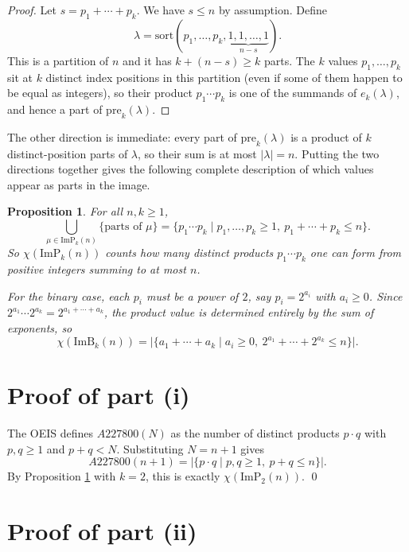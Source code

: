\documentclass[11pt]{article}
\newtheorem{proposition}[theorem]{Proposition}
\theoremstyle{remark}
\begin{document}
\begin{proof}
Let $s = p_1 + \cdots + p_k$. We have $s \leq n$ by assumption. Define
\[
\lambda = \mathrm{sort}\!\left(p_1, \dots, p_k, \underbrace{1, 1, \dots, 1}_{n - s}\right).
\]
This is a partition of $n$ and it has $k + (n - s) \geq k$ parts. The $k$ values $p_1, \dots, p_k$ sit at $k$ distinct index positions in this partition (even if some of them happen to be equal as integers), so their product $p_1 \cdots p_k$ is one of the summands of $e_k(\lambda)$, and hence a part of $\mathrm{pre}_k(\lambda)$.
\end{proof}

The other direction is immediate: every part of $\mathrm{pre}_k(\lambda)$ is a product of $k$ distinct-position parts of $\lambda$, so their sum is at most $|\lambda| = n$. Putting the two directions together gives the following complete description of which values appear as parts in the image.

\begin{proposition}\label{prop:char}
For all $n, k \geq 1$,
\[
\bigcup_{\mu \in \mathrm{ImP}_k(n)} \{\text{parts of } \mu\}
= \bigl\{ p_1 \cdots p_k \mid p_1, \dots, p_k \geq 1,\ p_1 + \cdots + p_k \leq n \bigr\}.
\]
So $\chi(\mathrm{ImP}_k(n))$ counts how many distinct products $p_1 \cdots p_k$ one can form from positive integers summing to at most $n$.

For the binary case, each $p_i$ must be a power of $2$, say $p_i = 2^{a_i}$ with $a_i \geq 0$. Since $2^{a_1} \cdots 2^{a_k} = 2^{a_1 + \cdots + a_k}$, the product value is determined entirely by the sum of exponents, so
\[
\chi(\mathrm{ImB}_k(n)) = \bigl|\bigl\{ a_1 + \cdots + a_k \mid a_i \geq 0,\ 2^{a_1} + \cdots + 2^{a_k} \leq n \bigr\}\bigr|.
\]
\end{proposition}

\section{Proof of part (i)}

The OEIS defines $A227800(N)$ as the number of distinct products $p \cdot q$ with $p, q \geq 1$ and $p + q < N$. Substituting $N = n + 1$ gives
\[
A227800(n+1) = \bigl|\{ p \cdot q \mid p, q \geq 1,\ p + q \leq n \}\bigr|.
\]
By Proposition \ref{prop:char} with $k = 2$, this is exactly $\chi(\mathrm{ImP}_2(n))$. \qed

\section{Proof of part (ii)}
\end{document}
